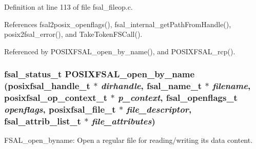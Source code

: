 Definition at line 113 of file fsal\_\-fileop.c.

References fsal2posix\_\-openflags(), fsal\_\-internal\_\-getPathFromHandle(), posix2fsal\_\-error(), and TakeTokenFSCall().

Referenced by POSIXFSAL\_\-open\_\-by\_\-name(), and POSIXFSAL\_\-rcp().
\subsubsection[{POSIXFSAL\_\-open\_\-by\_\-name}]{\setlength{\rightskip}{0pt plus 5cm}fsal\_\-status\_\-t POSIXFSAL\_\-open\_\-by\_\-name (posixfsal\_\-handle\_\-t $\ast$ {\em dirhandle}, \/  fsal\_\-name\_\-t $\ast$ {\em filename}, \/  posixfsal\_\-op\_\-context\_\-t $\ast$ {\em p\_\-context}, \/  fsal\_\-openflags\_\-t {\em openflags}, \/  posixfsal\_\-file\_\-t $\ast$ {\em file\_\-descriptor}, \/  fsal\_\-attrib\_\-list\_\-t $\ast$ {\em file\_\-attributes})}\label{fsal__fileop_8c_a30dfbf30fdcf712265cd8e7fb92bf81e}
FSAL\_\-open\_\-byname: Open a regular file for reading/writing its data content.


